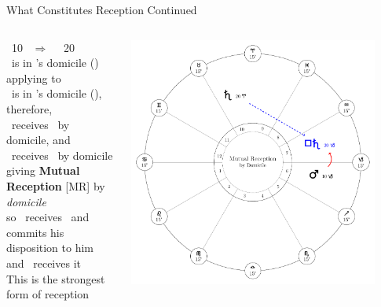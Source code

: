 \begin{frame}[t]{What Constitutes Reception Continued}
\begin{columns}[T, onlytextwidth]
\Mars\ 10 \Capricorn\ $\Rightarrow$ \Square\ \Saturn\ 20 \Aries \\
\ul
\vspace{0.5cm}
\Mars\ is in \Saturn's domicile (\Capricorn) applying to \Square\ \Saturn \\
\Saturn\ is in \Mars's domicile (\Aries), therefore, \\
\Mars\ receives \Saturn\ by domicile, and \\
\Saturn\ receives \Mars\ by domicile \\
\vspace{0.25cm}
giving  \textbf{Mutual Reception} [MR] by \textsl{domicile} \\
so \Mars\ receives \Saturn\ and commits his disposition to him and \Saturn\ receives it \\
\vspace{0.25cm}
This is the strongest form of reception


\begin{center}
{\includegraphics[width=0.9\textwidth]{charts/01-MR-by-domicile}} \\
\end{center}

\end{columns}
\end{frame}

